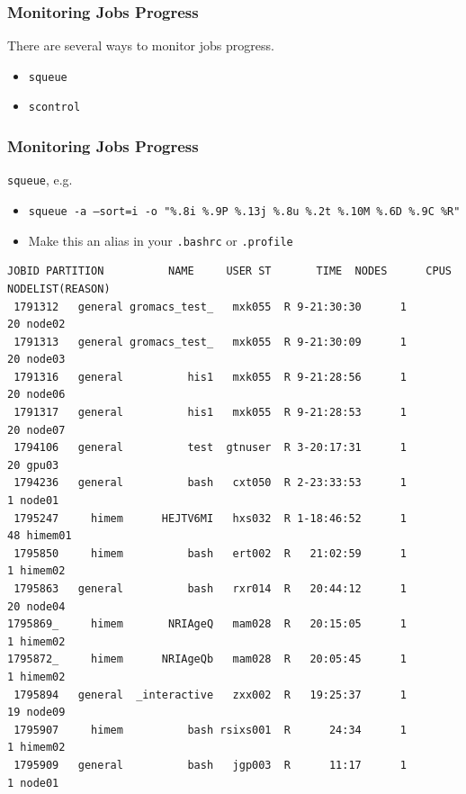 \documentclass{beamer}
\newcommand{\code}[1]{\colorbox{codegray}{\texttt{#1}}}
\begin{document}
\begin{frame}
\frametitle{Monitoring Jobs Progress}
There are several ways to monitor jobs progress.  
\bigskip
\begin{itemize}
    \item \code{squeue}
    \pause
    \bigskip
    \item \code{scontrol}
\end{itemize}
\end{frame}


\begin{frame}[fragile]
\frametitle{Monitoring Jobs Progress}
\code{squeue}, e.g. 
\begin{itemize}
    \item \begingroup
          \tiny
            \code{squeue -a --sort=i -o "\%.8i \%.9P \%.13j \%.8u \%.2t \%.10M \%.6D \%.9C \%R"}
          \endgroup
    \item Make this an alias in your \code{.bashrc} or \code{.profile}
    \pause
    \bigskip
\end{itemize}
\begingroup
\tiny
\begin{lstlisting}[backgroundcolor = \color{codegray},showstringspaces=false]
   JOBID PARTITION          NAME     USER ST       TIME  NODES      CPUS NODELIST(REASON)
 1791312   general gromacs_test_   mxk055  R 9-21:30:30      1        20 node02
 1791313   general gromacs_test_   mxk055  R 9-21:30:09      1        20 node03
 1791316   general          his1   mxk055  R 9-21:28:56      1        20 node06
 1791317   general          his1   mxk055  R 9-21:28:53      1        20 node07
 1794106   general          test  gtnuser  R 3-20:17:31      1        20 gpu03
 1794236   general          bash   cxt050  R 2-23:33:53      1         1 node01
 1795247     himem      HEJTV6MI   hxs032  R 1-18:46:52      1        48 himem01
 1795850     himem          bash   ert002  R   21:02:59      1         1 himem02
 1795863   general          bash   rxr014  R   20:44:12      1        20 node04
1795869_     himem       NRIAgeQ   mam028  R   20:15:05      1         1 himem02
1795872_     himem      NRIAgeQb   mam028  R   20:05:45      1         1 himem02
 1795894   general  _interactive   zxx002  R   19:25:37      1        19 node09
 1795907     himem          bash rsixs001  R      24:34      1         1 himem02
 1795909   general          bash   jgp003  R      11:17      1         1 node01
\end{lstlisting}
\endgroup
\end{frame}
\end{document}
